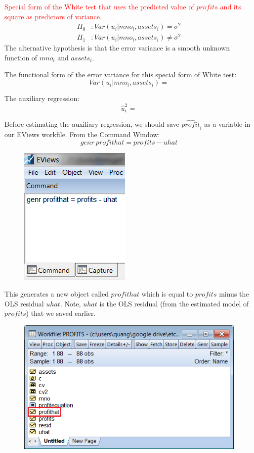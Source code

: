 \documentclass[12pt]{report}
\begin{document}
\noindent \textcolor{red}{Special form of the White test that uses the predicted value of $profits$ and its square as predictors of variance.} 
\begin{align*}
	H_0&: Var(u_i|mno_i,assets_i) = \sigma^2 \\
	H_1&: Var(u_i|mno_i,assets_i) \neq \sigma^2
\end{align*} The alternative hypothesis is that the error variance is a smooth unknown function of $mno_i$ and $assets_i$.

\noindent The functional form of the error variance for this special form of White test: $$Var(u_i|mno_i,assets_i) = $$

\noindent The auxiliary regression: $$\hat{u}^2_i = $$

\noindent Before estimating the auxiliary regression, we should save $\widehat{profit}_i$ as a variable in our EViews workfile. From the Command Window: $$genr\ profithat = profits-uhat$$
\begin{figure}[H]
	\centering
	\includegraphics{tute9_6}
\end{figure}
\vspace{-\baselineskip} \noindent This generates a new object called $profithat$ which is equal to $profits$ minus the OLS residual $uhat$. Note, $uhat$ is the OLS residual (from the estimated model of $profits$) that we saved earlier.
\begin{figure}[H]
	\centering
	\includegraphics{tute9_7}
\end{figure}
\end{document}
